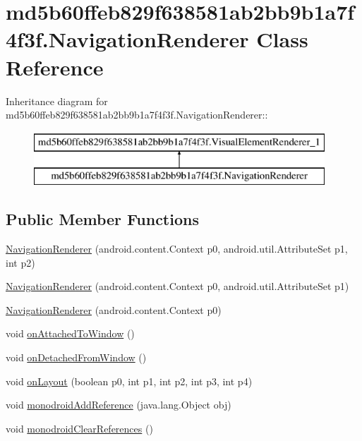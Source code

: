 \hypertarget{classmd5b60ffeb829f638581ab2bb9b1a7f4f3f_1_1_navigation_renderer}{
\section{md5b60ffeb829f638581ab2bb9b1a7f4f3f.NavigationRenderer Class Reference}
\label{classmd5b60ffeb829f638581ab2bb9b1a7f4f3f_1_1_navigation_renderer}
}
Inheritance diagram for md5b60ffeb829f638581ab2bb9b1a7f4f3f.NavigationRenderer::\begin{figure}[H]
\begin{center}
\leavevmode
\includegraphics[height=2cm]{classmd5b60ffeb829f638581ab2bb9b1a7f4f3f_1_1_navigation_renderer}
\end{center}
\end{figure}
\subsection*{Public Member Functions}
\begin{CompactItemize}
\item 
\hyperlink{classmd5b60ffeb829f638581ab2bb9b1a7f4f3f_1_1_navigation_renderer_4fd75f7ccc53756baaf34338ee29fa5c}{NavigationRenderer} (android.content.Context p0, android.util.AttributeSet p1, int p2)
\item 
\hyperlink{classmd5b60ffeb829f638581ab2bb9b1a7f4f3f_1_1_navigation_renderer_e79f4d9083161297dbede7b341873a6c}{NavigationRenderer} (android.content.Context p0, android.util.AttributeSet p1)
\item 
\hyperlink{classmd5b60ffeb829f638581ab2bb9b1a7f4f3f_1_1_navigation_renderer_f6814c5338c0aaf0027c562d0344ddca}{NavigationRenderer} (android.content.Context p0)
\item 
void \hyperlink{classmd5b60ffeb829f638581ab2bb9b1a7f4f3f_1_1_navigation_renderer_25d8c1e5ebe75b28d52ae09ac7bed4f6}{onAttachedToWindow} ()
\item 
void \hyperlink{classmd5b60ffeb829f638581ab2bb9b1a7f4f3f_1_1_navigation_renderer_c900a338e48e325dcc118a47937429c9}{onDetachedFromWindow} ()
\item 
void \hyperlink{classmd5b60ffeb829f638581ab2bb9b1a7f4f3f_1_1_navigation_renderer_7a117ff161f3a6f2d44642c32fba1306}{onLayout} (boolean p0, int p1, int p2, int p3, int p4)
\item 
void \hyperlink{classmd5b60ffeb829f638581ab2bb9b1a7f4f3f_1_1_navigation_renderer_081007f83180dc47c8fc1b19a1b14c29}{monodroidAddReference} (java.lang.Object obj)
\item 
void \hyperlink{classmd5b60ffeb829f638581ab2bb9b1a7f4f3f_1_1_navigation_renderer_475bdc366c4f2909604d6e217dba8235}{monodroidClearReferences} ()
\end{CompactItemize}
